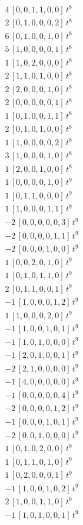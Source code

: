 \begin{align*}
4\,[0,0,1,1,0,0]\,t^{8} \\
2\,[0,1,0,0,0,2]\,t^{8} \\
6\,[0,1,0,0,1,0]\,t^{8} \\
5\,[1,0,0,0,0,1]\,t^{8} \\
1\,[1,0,2,0,0,0]\,t^{8} \\
2\,[1,1,0,1,0,0]\,t^{8} \\
2\,[2,0,0,0,1,0]\,t^{8} \\
2\,[0,0,0,0,0,1]\,t^{8} \\
1\,[0,1,0,0,1,1]\,t^{8} \\
2\,[0,1,0,1,0,0]\,t^{8} \\
1\,[1,0,0,0,0,2]\,t^{8} \\
3\,[1,0,0,0,1,0]\,t^{8} \\
1\,[2,0,0,1,0,0]\,t^{8} \\
1\,[0,0,0,0,1,0]\,t^{9} \\
1\,[0,1,1,0,0,0]\,t^{9} \\
1\,[1,0,0,0,1,1]\,t^{9} \\
-2\,[0,0,0,0,0,3]\,t^{9} \\
-2\,[0,0,0,0,1,1]\,t^{9} \\
-2\,[0,0,0,1,0,0]\,t^{9} \\
1\,[0,0,2,0,1,0]\,t^{9} \\
1\,[0,1,0,1,1,0]\,t^{9} \\
2\,[0,1,1,0,0,1]\,t^{9} \\
-1\,[1,0,0,0,1,2]\,t^{9} \\
1\,[1,0,0,0,2,0]\,t^{9} \\
-1\,[1,0,0,1,0,1]\,t^{9} \\
-1\,[1,0,1,0,0,0]\,t^{9} \\
-1\,[2,0,1,0,0,1]\,t^{9} \\
-2\,[2,1,0,0,0,0]\,t^{9} \\
-1\,[4,0,0,0,0,0]\,t^{9} \\
-1\,[0,0,0,0,0,4]\,t^{9} \\
-2\,[0,0,0,0,1,2]\,t^{9} \\
-1\,[0,0,0,1,0,1]\,t^{9} \\
-2\,[0,0,1,0,0,0]\,t^{9} \\
1\,[0,1,0,2,0,0]\,t^{9} \\
1\,[0,1,1,0,1,0]\,t^{9} \\
1\,[0,2,0,0,0,1]\,t^{9} \\
-1\,[1,0,0,1,0,2]\,t^{9} \\
2\,[1,0,0,1,1,0]\,t^{9} \\
-1\,[1,0,1,0,0,1]\,t^{9} \\

\end{align*}
